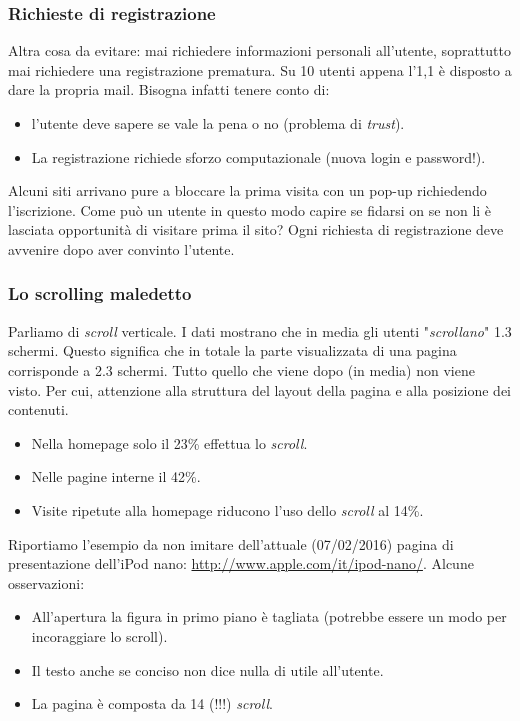 		\subsubsection{Richieste di registrazione}
			Altra cosa da evitare: mai richiedere informazioni personali all'utente, soprattutto mai richiedere una registrazione prematura. Su 10 utenti appena l'1,1 è disposto a dare la propria mail.	Bisogna infatti tenere conto di:
			\begin{itemize}
				\item l'utente deve sapere se vale la pena o no (problema di \emph{trust}).
				\item La registrazione richiede sforzo computazionale (nuova login e password!).
			\end{itemize}
			Alcuni siti arrivano pure a bloccare la prima visita con un pop-up richiedendo l'iscrizione. Come può un utente in questo modo capire se fidarsi on se non li è lasciata opportunità di visitare prima il sito? Ogni richiesta di registrazione deve avvenire dopo aver convinto l'utente.
			
		
		\subsubsection{Lo scrolling maledetto}
			Parliamo di \emph{scroll} verticale. I dati mostrano che in media gli utenti "\emph{scrollano}" 1.3 schermi. Questo significa che in totale la parte visualizzata di una pagina corrisponde a 2.3 schermi. Tutto quello che viene dopo (in media) non viene visto. Per cui, attenzione alla struttura del layout della pagina e alla posizione dei contenuti.
			\begin{itemize}
				\item Nella homepage solo il 23\% effettua lo \emph{scroll}.
				\item Nelle pagine interne il 42\%.
				\item Visite ripetute alla homepage riducono l'uso dello \emph{scroll} al 14\%.
			\end{itemize}
			Riportiamo l'esempio da non imitare dell'attuale (07/02/2016) pagina di presentazione dell'iPod nano: \url{http://www.apple.com/it/ipod-nano/}. Alcune osservazioni:
			\begin{itemize}
				\item All'apertura la figura in primo piano è tagliata (potrebbe essere un modo per incoraggiare lo scroll).
				\item Il testo anche se conciso non dice nulla di utile all'utente.
				\item La pagina è composta da 14 (!!!) \emph{scroll}.
			\end{itemize}
			
